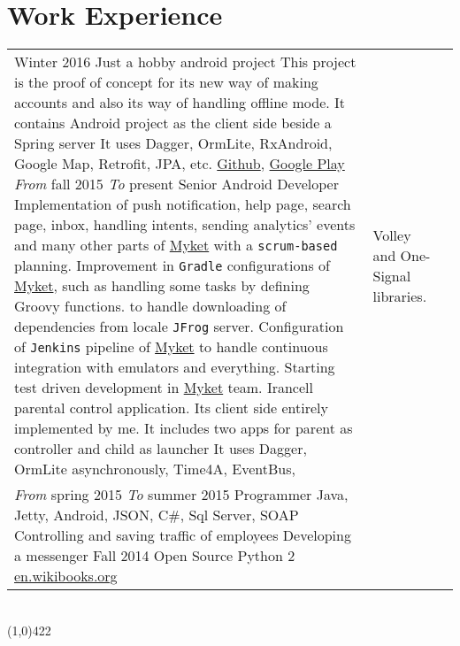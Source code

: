 \documentclass[10pt]{article}
\newcommand\HRule{\hspace*{.8cm}\line(1,0){422}\\}
\newenvironment{Record}[1]
{
    \vspace{-0.5cm}
    \section*{#1}
        \vspace{0.1cm}
        \begin{tabular}
}
{
        \end{tabular}\\
        \HRule
}
\begin{document}
\newcommand{\WorkExperienceHasinTwo}[1]{
                &       \quad\quad #1\\
}


\begin{Record}{Work Experience}{l l l}
    \WorkExperience{Free Map}
        {Winter 2016}{}
        {Just a hobby android project}
        {This project is the proof of concept for its new way of making accounts }
        {and also its way of handling offline mode.}
        {It contains Android project as the client side beside a Spring server}
        {It uses Dagger, OrmLite, RxAndroid, Google Map, Retrofit, JPA, etc.}
        {\href{https://github.com/hadilq/HobbyTaste}{Github}, \href{https://play.google.com/store/apps/details?id=ir.asparsa.hobbytaste}{Google Play}}%
    \WorkExperience{\href{http://hasintech.com}{Hasin Technology}}
        {\scriptsize\textit{From} fall 2015}
        {\scriptsize\textit{To} present}
        {Senior Android Developer}
        {Implementation of push notification, help page, }
        {search page, inbox, handling intents, sending analytics' events}
        {and many other parts of \href{http://myket.ir}{Myket} with a  \scriptsize{\texttt{scrum-based}} planning.}
        {Improvement in \texttt{Gradle} configurations of \href{http://myket.ir}{Myket},}
        {such as handling some tasks by defining Groovy functions.}%
    \WorkExperienceHasinOne{Improvement in \texttt{Maven} configurations of \href{http://myket.ir}{Myket}}
        {to handle downloading of dependencies from locale \scriptsize{\texttt{JFrog}} server.}
        {Configuration of \scriptsize{\texttt{Jenkins}} pipeline of \href{http://myket.ir}{Myket}}
        {to handle continuous integration with emulators and everything.}
        {Starting test driven development in \href{http://myket.ir}{Myket} team.}
        {Irancell parental control application.}
        {Its client side entirely implemented by me.}
        {It includes two apps for parent as controller and child as launcher}
        {It uses Dagger, OrmLite asynchronously, Time4A, EventBus,}%
    \WorkExperienceHasinTwo{Volley and One-Signal libraries.}%
    \WorkExperience{\href{http://sohasys.ir}{Soha Company}}
        {\scriptsize\textit{From} spring 2015}
        {\scriptsize\textit{To} summer 2015}
        {Programmer}
        {Java, Jetty, Android, JSON, C\#, Sql Server, SOAP}
        {Controlling and saving traffic of employees}
        {Developing a messenger}
        {}{}%
    \WorkExperience{Persian Calendar}
        {Fall 2014}{}
        {Open Source}
        {Python 2}
        {\href{http://en.wikibooks.org/wiki/Persian_Calendar}{en.wikibooks.org}}

\end{Record}
\end{document}

